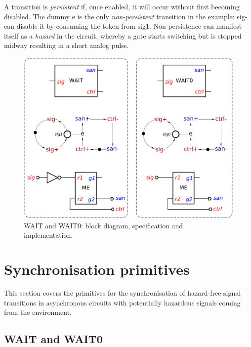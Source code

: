 \documentclass[conference]{IEEEtran}
\begin{document}
A transition is \emph{persistent} if, once enabled, it will occur without first becoming
disabled. The dummy \textsf{e} is the only \emph{non-persistent} transition in the
example: \textsf{sig-} can disable it by consuming the token from \textsf{sig1}. Non-persistence
can manifest itself as a \emph{hazard} in the circuit, whereby a gate starts
switching but is stopped midway resulting in a short analog pulse.


\begin{figure}
\begin{center}
    \includegraphics[scale=0.23]{fig/WAIT.pdf}
    \caption{\textsf{WAIT} and \textsf{WAIT0}: block diagram,
    specification and implementation.}
    \label{fig:wait}
    \vspace{-4mm}
\end{center}
\end{figure}

\section{Synchronisation primitives}\label{sec-sync}

This section covers the primitives for the synchronisation of hazard-free signal
transitions in asynchronous circuits with potentially hazardous signals coming
from the environment.

\subsection*{\textsf{WAIT} and \textsf{WAIT0}}
\end{document}
